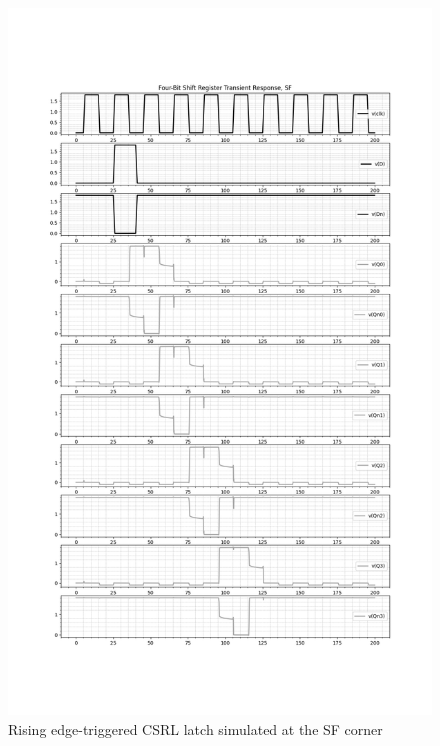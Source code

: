 \documentclass[11pt]{article}
\begin{document}
\begin{figure}[H]
  \centering
  \includegraphics[width=13cm]{media/csrl_rising_edge_x4_sf.png}
  \caption{Rising edge-triggered CSRL latch simulated at the SF corner}
\end{figure}
\end{document}
